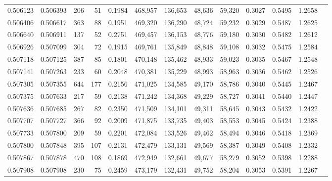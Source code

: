 \begin{tabular}{rrrrrrrrrrrrr}
0.506123 & 0.506393 &   206 &    51 &                                     0.1984 & 468,957 & 136,653 &  48,636 &  59,320 & 0.3027 & 0.5495 & 1.2658 \\
0.506406 & 0.506617 &   363 &    88 &                                     0.1951 & 469,320 & 136,290 &  48,724 &  59,232 & 0.3029 & 0.5487 & 1.2625 \\
0.506640 & 0.506911 &   137 &    52 &                                     0.2751 & 469,457 & 136,153 &  48,776 &  59,180 & 0.3030 & 0.5482 & 1.2612 \\
0.506926 & 0.507099 &   304 &    72 &                                     0.1915 & 469,761 & 135,849 &  48,848 &  59,108 & 0.3032 & 0.5475 & 1.2584 \\
0.507118 & 0.507125 &   387 &    85 &                                     0.1801 & 470,148 & 135,462 &  48,933 &  59,023 & 0.3035 & 0.5467 & 1.2548 \\
0.507141 & 0.507263 &   233 &    60 &                                     0.2048 & 470,381 & 135,229 &  48,993 &  58,963 & 0.3036 & 0.5462 & 1.2526 \\
0.507305 & 0.507355 &   644 &   177 &                                     0.2156 & 471,025 & 134,585 &  49,170 &  58,786 & 0.3040 & 0.5445 & 1.2467 \\
0.507375 & 0.507633 &   217 &    59 &                                     0.2138 & 471,242 & 134,368 &  49,229 &  58,727 & 0.3041 & 0.5440 & 1.2447 \\
0.507636 & 0.507685 &   267 &    82 &                                     0.2350 & 471,509 & 134,101 &  49,311 &  58,645 & 0.3043 & 0.5432 & 1.2422 \\
0.507707 & 0.507727 &   366 &    92 &                                     0.2009 & 471,875 & 133,735 &  49,403 &  58,553 & 0.3045 & 0.5424 & 1.2388 \\
0.507733 & 0.507800 &   209 &    59 &                                     0.2201 & 472,084 & 133,526 &  49,462 &  58,494 & 0.3046 & 0.5418 & 1.2369 \\
0.507800 & 0.507848 &   395 &   107 &                                     0.2131 & 472,479 & 133,131 &  49,569 &  58,387 & 0.3049 & 0.5408 & 1.2332 \\
0.507867 & 0.507878 &   470 &   108 &                                     0.1869 & 472,949 & 132,661 &  49,677 &  58,279 & 0.3052 & 0.5398 & 1.2288 \\
0.507908 & 0.507908 &   230 &    75 &                                     0.2459 & 473,179 & 132,431 &  49,752 &  58,204 & 0.3053 & 0.5391 & 1.2267 \\

\end{tabular}
